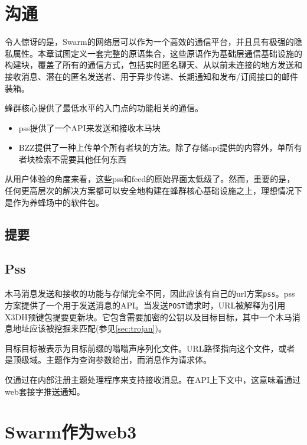 \section{沟通\statusred}\label{sec:messaging}


令人惊讶的是，Swarm的网络层可以作为一个高效的通信平台，并且具有极强的隐私属性。本章试图定义一套完整的原语集合，这些原语作为基础层通信基础设施的构建块，覆盖了所有的通信方式，包括实时匿名聊天、从以前未连接的地方发送和接收消息、潜在的匿名发送者、用于异步传递、长期通知和发布/订阅接口的邮件装箱。 

蜂群核心提供了最低水平的入门点的功能相关的通信。

\begin{itemize}
    \item pss提供了一个API来发送和接收木马块
    \item BZZ提供了一种上传单个所有者块的方法。除了存储api提供的内容外，单所有者块检索不需要其他任何东西
\end{itemize}



从用户体验的角度来看，这些pss和feed的原始界面太低级了。然而，重要的是，任何更高层次的解决方案都可以安全地构建在蜂群核心基础设施之上，理想情况下是作为养蜂场中的软件包。

\subsection{提要\statusorange}\label{sec:feeds-ux}


\subsection{Pss \statusorange}\label{sec:pss-ux}

木马消息发送和接收的功能与存储完全不同，因此应该有自己的url方案\lstinline{pss}。pss方案提供了一个用于发送消息的API。当发送\lstinline{POST}请求时，URL被解释为引用X3DH预键包提要更新块。它包含需要加密的公钥以及目标目标，其中一个木马消息地址应该被挖掘来匹配(参见\ref{sec:trojan})。 

目标目标被表示为目标前缀的嗡嗡声序列化文件。URL路径指向这个文件，或者是顶级域。主题作为查询参数给出，而消息作为请求体。

仅通过在内部注册主题处理程序来支持接收消息。在API上下文中，这意味着通过web套接字推送通知。



\section{Swarm作为web3 }\label{sec:buzz-apiary}

